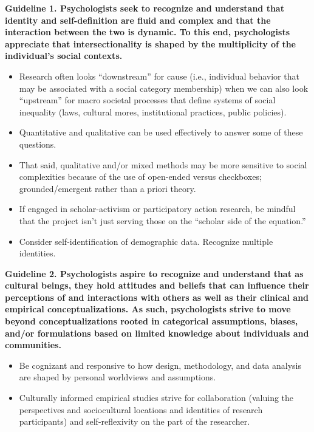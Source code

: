 \documentclass[
  english,
]{book}
\providecommand{\tightlist}{%
  \setlength{\itemsep}{0pt}\setlength{\parskip}{0pt}}
\begin{document}
\textbf{Guideline 1. Psychologists seek to recognize and understand that identity and self-definition are fluid and complex and that the interaction between the two is dynamic. To this end, psychologists appreciate that intersectionality is shaped by the multiplicity of the individual's social contexts.}

\begin{itemize}
\tightlist
\item
  Research often looks ``downstream'' for cause (i.e., individual behavior that may be associated with a social category membership) when we can also look ``upstream'' for macro societal processes that define systems of social inequality (laws, cultural mores, institutional practices, public policies).
\item
  Quantitative and qualitative can be used effectively to answer some of these questions.
\item
  That said, qualitative and/or mixed methods may be more sensitive to social complexities because of the use of open-ended versus checkboxes; grounded/emergent rather than a priori theory.
\item
  If engaged in scholar-activism or participatory action research, be mindful that the project isn't just serving those on the ``scholar side of the equation.''
\item
  Consider self-identification of demographic data. Recognize multiple identities.
\end{itemize}

\textbf{Guideline 2. Psychologists aspire to recognize and understand that as cultural beings, they hold attitudes and beliefs that can influence their perceptions of and interactions with others as well as their clinical and empirical conceptualizations. As such, psychologists strive to move beyond conceptualizations rooted in categorical assumptions, biases, and/or formulations based on limited knowledge about individuals and communities.}

\begin{itemize}
\tightlist
\item
  Be cognizant and responsive to how design, methodology, and data analysis are shaped by personal worldviews and assumptions.
\item
  Culturally informed empirical studies strive for collaboration (valuing the perspectives and sociocultural locations and identities of research participants) and self-reflexivity on the part of the researcher.
\end{itemize}
\end{document}
